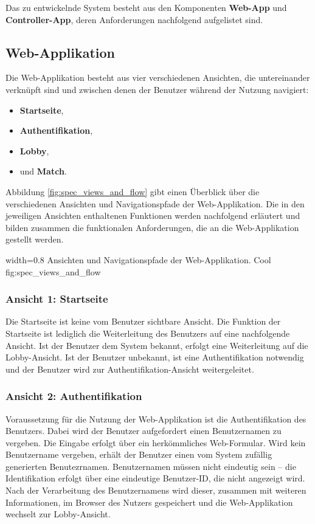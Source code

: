 Das zu entwickelnde System besteht aus den Komponenten \textbf{Web-App}
und \textbf{Controller-App}, deren Anforderungen nachfolgend aufgelistet
sind.

\subsection{Web-Applikation}\label{web-applikation}

Die Web-Applikation besteht aus vier verschiedenen Ansichten, die
untereinander verknüpft sind und zwischen denen der Benutzer während der
Nutzung navigiert:

\begin{itemize}
\tightlist
\item
  \textbf{Startseite},
\item
  \textbf{Authentifikation},
\item
  \textbf{Lobby},
\item
  und \textbf{Match}.
\end{itemize}

Abbildung \ref{fig:spec_views_and_flow} gibt einen Überblick über die
verschiedenen Ansichten und Navigationspfade der Web-Applikation. Die in
den jeweiligen Ansichten enthaltenen Funktionen werden nachfolgend
erläutert und bilden zusammen die funktionalen Anforderungen, die an die
Web-Applikation gestellt werden.

    {width=0.8\textwidth}
    {Ansichten und Navigationspfade der Web-Applikation.}
    {Cool}
    {fig:spec_views_and_flow}

\subsubsection*{Ansicht 1: Startseite}

Die Startseite ist keine vom Benutzer sichtbare Ansicht. Die Funktion
der Startseite ist lediglich die Weiterleitung des Benutzers auf eine
nachfolgende Ansicht. Ist der Benutzer dem System bekannt, erfolgt eine
Weiterleitung auf die Lobby-Ansicht. Ist der Benutzer unbekannt, ist
eine Authentifikation notwendig und der Benutzer wird zur
Authentifikation-Ansicht weitergeleitet.

\subsubsection*{Ansicht 2: Authentifikation}

Voraussetzung für die Nutzung der Web-Applikation ist die
Authentifikation des Benutzers. Dabei wird der Benutzer aufgefordert
einen Benutzernamen zu vergeben. Die Eingabe erfolgt über ein
herkömmliches Web-Formular. Wird kein Benutzername vergeben, erhält der
Benutzer einen vom System zufällig generierten Benutezrnamen.
Benutzernamen müssen nicht eindeutig sein -- die Identifikation erfolgt
über eine eindeutige Benutzer-ID, die nicht angezeigt wird. Nach der
Verarbeitung des Benutzernamens wird dieser, zusammen mit weiteren
Informationen, im Browser des Nutzers gespeichert und die
Web-Applikation wechselt zur Lobby-Ansicht.

